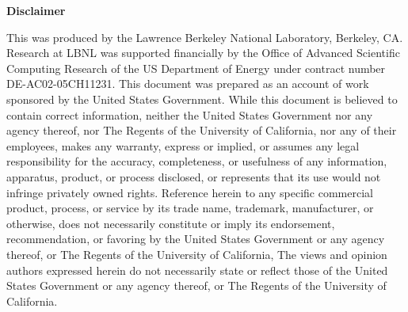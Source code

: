 \begin{center}
{\bf Disclaimer}
\end{center}
This was produced by the Lawrence Berkeley National Laboratory,
Berkeley, CA. Research at LBNL was supported financially by the Office
of Advanced Scientific Computing Research of the US Department of
Energy under contract number DE-AC02-05CH11231.  This document was
prepared as an account of work sponsored by the United States
Government.  While this document is believed to contain correct
information, neither the United States Government nor any agency
thereof, nor The Regents of the University of California, nor any of
their employees, makes any warranty, express or implied, or assumes
any legal responsibility for the accuracy, completeness, or usefulness
of any information, apparatus, product, or process disclosed, or
represents that its use would not infringe privately owned rights.
Reference herein to any specific commercial product, process, or
service by its trade name, trademark, manufacturer, or otherwise, does
not necessarily constitute or imply its endorsement, recommendation,
or favoring by the United States Government or any agency thereof, or
The Regents of the University of California, The views and opinion
authors expressed herein do not necessarily state or reflect those of
the United States Government or any agency thereof, or The Regents of
the University of California.
